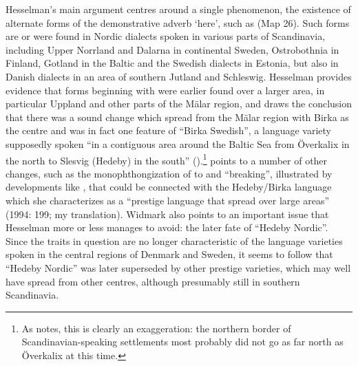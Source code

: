 Hesselman’s main argument centres around a single phenomenon, the existence of alternate forms of the demonstrative adverb  ‘here’, such as  (Map 26). Such forms are or were found in Nordic dialects spoken in various parts of Scandinavia, including Upper Norrland and Dalarna in continental Sweden, Ostrobothnia in Finland, Gotland in the Baltic and the Swedish dialects in Estonia, but also in Danish dialects in an area of southern Jutland and Schleswig. Hesselman provides evidence that forms beginning with  were earlier found over a larger area, in particular Uppland and other parts of the Mälar region, and draws the conclusion that there was a sound change  which spread from the Mälar region with Birka as the centre and was in fact one feature of “Birka Swedish”, a language variety supposedly spoken “in a contiguous area around the Baltic Sea from Överkalix in the north to Slesvig (Hedeby) in the south” (\citet[158]{Hesselman1936}).\footnote{ As \citet{Widmark1994} notes, this is clearly an exaggeration: the northern border of Scandinavian-speaking settlements most probably did not go as far north as Överkalix at this time.} \citet{Widmark1994} points to a number of other changes,  such as the monophthongization of  to and “breaking”, illustrated by developments like , that could be connected with the Hedeby/Birka language which she characterizes as a “prestige language that spread over large areas” (1994: 199; my translation). Widmark also points to an important issue that Hesselman more or less manages to avoid: the later fate of “Hedeby Nordic”. Since the traits in question are no longer characteristic of the language varieties spoken in the central regions of Denmark and Sweden, it seems to follow that “Hedeby Nordic” was later superseded by other prestige varieties, which may well have spread from other centres, although presumably still in southern Scandinavia. 




